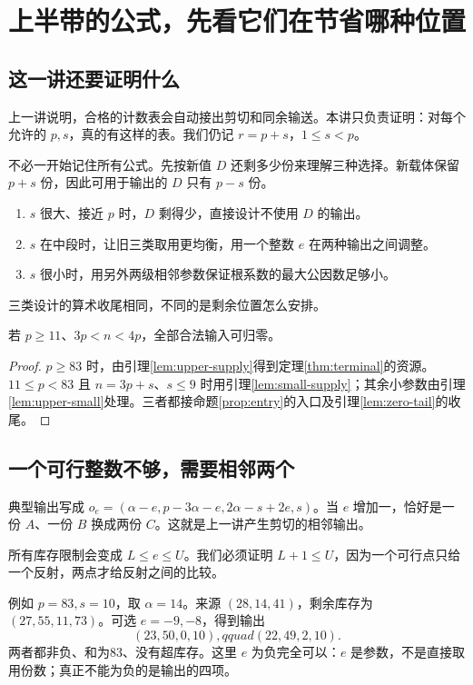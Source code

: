 \chapter{上半带的公式，先看它们在节省哪种位置}\label{ch:upper}
\section{这一讲还要证明什么}
上一讲说明，合格的计数表会自动接出剪切和同余输送。本讲只负责证明：对每个允许的 $p,s$，真的有这样的表。我们仍记 $r=p+s$，$1\le s<p$。

不必一开始记住所有公式。先按新值 $D$ 还剩多少份来理解三种选择。新载体保留 $p+s$ 份，因此可用于输出的 $D$ 只有 $p-s$ 份。
\begin{enumerate}
\item $s$ 很大、接近 $p$ 时，$D$ 剩得少，直接设计不使用 $D$ 的输出。
\item $s$ 在中段时，让旧三类取用更均衡，用一个整数 $e$ 在两种输出之间调整。
\item $s$ 很小时，用另外两级相邻参数保证根系数的最大公因数足够小。
\end{enumerate}
三类设计的算术收尾相同，不同的是剩余位置怎么安排。
\begin{proposition}[上半带的充分性]\label{prop:upper}
若 $p\ge11$、$3p<n<4p$，全部合法输入可归零。
\end{proposition}
\begin{proof}
$p\ge83$ 时，由引理\ref{lem:upper-supply}得到定理\ref{thm:terminal}的资源。$11\le p<83$ 且 $n=3p+s$、$s\le9$ 时用引理\ref{lem:small-supply}；其余小参数由引理\ref{lem:upper-small}处理。三者都接命题\ref{prop:entry}的入口及引理\ref{lem:zero-tail}的收尾。
\end{proof}

\section{一个可行整数不够，需要相邻两个}
典型输出写成 $o_e=(\alpha-e,p-3\alpha-e,2\alpha-s+2e,s)$。当 $e$ 增加一，恰好是一份 $A$、一份 $B$ 换成两份 $C$。这就是上一讲产生剪切的相邻输出。

所有库存限制会变成 $L\le e\le U$。我们必须证明 $L+1\le U$，因为一个可行点只给一个反射，两点才给反射之间的比较。

例如 $p=83,s=10$，取 $\alpha=14$。来源 $(28,14,41)$，剩余库存为 $(27,55,11,73)$。可选 $e=-9,-8$，得到输出
\[(23,50,0,10),qquad(22,49,2,10).
\]
两者都非负、和为83、没有超库存。这里 $e$ 为负完全可以：$e$ 是参数，不是直接取用份数；真正不能为负的是输出的四项。

